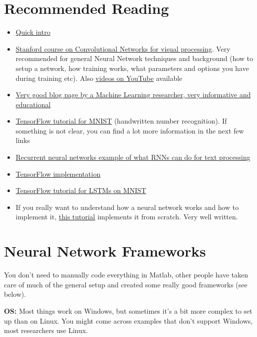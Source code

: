 \documentclass[]{article}
\begin{document}
\section{Recommended Reading}

\begin{itemize}
	\item \href{https://www.youtube.com/watch?v=BR9h47Jtqyw}{Quick intro}
	\item \href{http://cs231n.stanford.edu/}{Stanford course on Convolutional Networks for visual processing}. Very recommended for general Neural Network techniques and background (how to setup a network, how training works, what parameters and options you have during training etc). Also \href{https://www.youtube.com/watch?v=LxfUGhug-iQ}{videos on YouTube} available
	\item \href{http://colah.github.io/}{Very good blog page by a Machine Learning researcher, very informative and educational}
	\item \href{https://www.tensorflow.org/get_started/mnist/beginners}{TensorFlow tutorial for MNIST} (handwritten number recognition). If something is not clear, you can find a lot more information in the next few links
	\item \href{http://karpathy.github.io/2015/05/21/rnn-effectiveness/}{Recurrent neural networks example of what RNNs can do for text processing}
	\item \href{https://github.com/sherjilozair/char-rnn-tensorflow}{TensorFlow implementation}
	\item \href{https://jasdeep06.github.io/posts/Understanding-LSTM-in-Tensorflow-MNIST/}{TensorFlow tutorial for LSTMs on MNIST}
	\item If you really want to understand how a neural network works and how to implement it, \href{http://www.wildml.com/2015/09/implementing-a-neural-network-from-scratch/}{this tutorial} implements it from scratch. Very well written.
\end{itemize}

\section{Neural Network Frameworks}
You don't need to manually code everything in Matlab, other people have taken care of much of the general setup and created some really good frameworks (see below).

\textbf{OS:} Most things work on Windows, but sometimes it's a bit more complex to set up than on Linux. You might come across examples that don't support Windows, most researchers use Linux.
\end{document}
